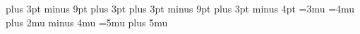 \abovedisplayskip=12pt plus 3pt minus 9pt %
\abovedisplayshortskip=0pt plus 3pt %
\belowdisplayskip=12pt plus 3pt minus 9pt %
\belowdisplayshortskip=7pt plus 3pt minus 4pt %
\thinmuskip=3mu %
\medmuskip=4mu plus 2mu minus 4mu %
\thickmuskip=5mu plus 5mu %
\delimitershortfall=5pt %
\nulldelimiterspace=1.2pt %
\scriptspace=0.5pt %
